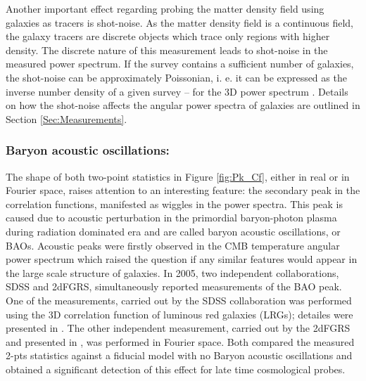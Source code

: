 \qquad Another important effect regarding probing the matter density field using galaxies as tracers is shot-noise. As the matter density field is a continuous field, the galaxy tracers are discrete objects which trace only regions with higher density. The discrete nature of this measurement leads to shot-noise in the measured power spectrum. If the survey contains a sufficient number of galaxies, the shot-noise can be approximately Poissonian, i. e. it can be expressed as the inverse number density of a given survey -- for the 3D power spectrum  \citep{1994FKP,2009Seljak-ShotNoise,2017Paech}. Details on how the shot-noise affects the angular power spectra of galaxies are outlined in Section \ref{Sec:Measurements}.

\subsubsection{Baryon acoustic oscillations:}
The shape of both two-point statistics in Figure \ref{fig:Pk_Cf}, either in real or in Fourier space, raises attention to an interesting feature: the secondary peak in the correlation functions, manifested as wiggles in the power spectra. This peak is caused due to acoustic perturbation in the primordial baryon-photon plasma during radiation dominated era and are called baryon acoustic oscillations, or BAOs. Acoustic peaks were firstly observed in the CMB temperature angular power spectrum which raised the question if any similar features would appear in the large scale structure of galaxies. In 2005, two independent collaborations, SDSS and 2dFGRS, simultaneously reported measurements of the BAO peak. One of the measurements, carried out by the SDSS collaboration was performed using the 3D correlation function of luminous red galaxies (LRGs); detailes were presented in \cite{Einsenstein2005}. The other independent measurement, carried out by the 2dFGRS and presented in \cite{2005Cole-2dF}, was performed in Fourier space. Both compared the measured 2-pts statistics against a fiducial model with no Baryon acoustic oscillations and obtained a significant detection of this effect for late time cosmological probes.

